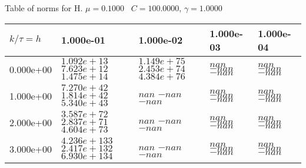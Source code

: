 \begin{center}
Table of norms for H. $\mu = 0.1000$ \, $C = 100.0000$, $\gamma = 1.0000$
  
\begin{tabular}{|p{1in}|p{1in}|p{1in}|p{1in}|p{1in}|} \hline
$k / \tau = h$ &1.000e-01 &1.000e-02 &1.000e-03 &1.000e-04 \\ \hline 
0.000e+00 & $1.092e+13$  $7.623e+12$  $1.475e+14$  & $1.149e+75$  $2.453e+74$  $4.384e+76$  & $nan$  $-nan$  $-nan$  & $nan$  $-nan$  $-nan$  \\ \hline 
1.000e+00 & $7.270e+42$  $1.814e+42$  $5.340e+43$  & $nan$  $-nan$  $-nan$  & $nan$  $-nan$  $-nan$  & $nan$  $-nan$  $-nan$  \\ \hline 
2.000e+00 & $3.587e+72$  $2.837e+71$  $4.604e+73$  & $nan$  $-nan$  $-nan$  & $nan$  $-nan$  $-nan$  & $nan$  $-nan$  $-nan$  \\ \hline 
3.000e+00 & $4.236e+133$  $2.417e+132$  $6.930e+134$  & $nan$  $-nan$  $-nan$  & $nan$  $-nan$  $-nan$  & $nan$  $-nan$  $-nan$  \\ \hline 

\end{tabular}\\[20pt]
\end{center}
